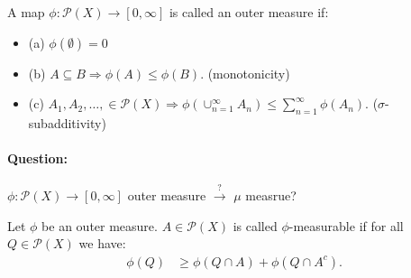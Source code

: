 \documentclass[../../note.tex]{subfiles}
\begin{document}
\begin{definition}
    \label{def: outer measure}
    A map $\phi: \mathcal{P}(X) \rightarrow [0,\infty]$ is called an outer measure if:
    \begin{itemize}
        \item (a) $\phi(\emptyset) = 0$
        \item (b) $A \subseteq B \Longrightarrow \phi(A) \leq \phi(B)$. (monotonicity)
        \item (c) $A_1, A_2,\dots, \in \mathcal{P}(X) \Longrightarrow \phi \left(\cup_{n=1}^\infty A_n \right) \leq \sum_{n=1}^{\infty} \phi(A_n)$. ($\sigma$-subadditivity)
    \end{itemize}
\end{definition}

\paragraph{Question:}
$\phi: \mathcal{P}(X) \rightarrow [0,\infty]$ outer measure $\stackrel{?}{\longrightarrow}$ $\mu$ measrue?

\begin{definition}
    Let $\phi$ be an outer measure. $A \in \mathcal{P}(X)$ is called $\phi$-measurable if for all $Q \in \mathcal{P}(X)$ we have:
    \begin{align}
        \phi(Q)
        &\geq \phi(Q \cap A) + \phi(Q \cap A^c).
    \end{align}
\end{definition}
\end{document}
